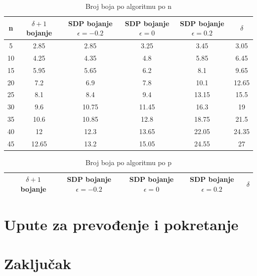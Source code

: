 \documentclass[diplomskirad]{fer}
\begin{document}
\begin{table}
  \caption{Broj boja po algoritmu po n}
  \label{table:bojanje_n}
  \begin{tabular}{|c|c|c|c|c|c|}
    \hline
    n & $\delta +1$ bojanje & SDP bojanje $\epsilon = -0.2$& SDP bojanje $\epsilon = 0$ & SDP bojanje $\epsilon = 0.2$ & $\delta$ \\
    \hline
    \hline
      5 & 2.85 & 2.85 & 3.25 & 3.45 & 3.05 \\
      \hline
      10 & 4.25 & 4.35 & 4.8 & 5.85 & 6.45 \\
      \hline
      15 & 5.95 & 5.65 & 6.2 & 8.1 & 9.65 \\
      \hline
      20 & 7.2 & 6.9 & 7.8 & 10.1 & 12.65 \\
      \hline
      25 & 8.1 & 8.4 & 9.4 & 13.15 & 15.5 \\
      \hline
      30 & 9.6 & 10.75 & 11.45 & 16.3 & 19 \\
      \hline
      35 & 10.6 & 10.85 & 12.8 & 18.75 & 21.5 \\
      \hline
      40 & 12 & 12.3 & 13.65 & 22.05 & 24.35 \\
      \hline
      45 & 12.65 & 13.2 & 15.05 & 24.55 & 27 \\
      \hline
  \end{tabular}
\end{table}

\begin{table}
  \caption{Broj boja po algoritmu po p}
  \label{table:bojanje_p}
  \begin{tabular}{|c|c|c|c|c|c|}
    \hline
     & $\delta +1$ bojanje & SDP bojanje $\epsilon = -0.2$& SDP bojanje $\epsilon = 0$ & SDP bojanje $\epsilon = 0.2$ & $\delta$ \\
    \hline
    \hline
    
  \end{tabular}
\end{table}

\chapter{Upute za prevođenje i pokretanje}
\label{pog:upute_za_prevođenje_i_pokretanje}

\chapter{Zaključak}
\label{pog:zakljucak}
\end{document}
